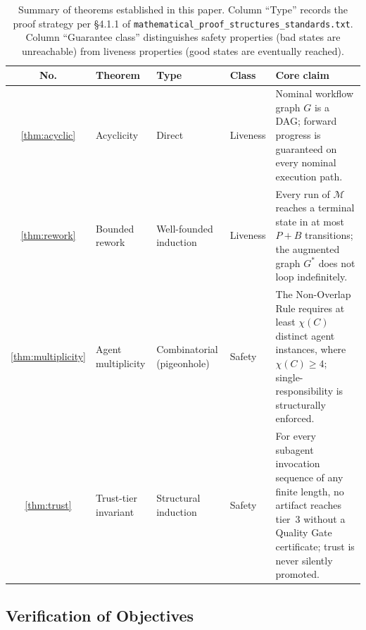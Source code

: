 \documentclass[12pt]{article}
\theoremstyle{definition}
\newcommand{\code}[1]{\texttt{#1}}
\newcommand{\ProofStd}{\code{mathematical\_proof\_\allowbreak structures\_standards.txt}}
\begin{document}
\begin{table}[H]
\centering
\caption{Summary of theorems established in this paper.
         Column ``Type'' records the proof strategy
         per \S4.1.1 of \ProofStd{}.
         Column ``Guarantee class'' distinguishes safety
         properties (bad states are unreachable) from
         liveness properties (good states are eventually reached).}
\label{tab:thm-summary}
\small
\begin{tabular}{@{}clllp{4.8cm}@{}}
\toprule
\textbf{No.} & \textbf{Theorem} & \textbf{Type} &
\textbf{Class} & \textbf{Core claim} \\
\midrule
\ref{thm:acyclic}
  & Acyclicity
  & Direct
  & Liveness
  & Nominal workflow graph $G$ is a DAG; forward
    progress is guaranteed on every nominal
    execution path. \\[4pt]
\ref{thm:rework}
  & Bounded rework
  & Well-founded induction
  & Liveness
  & Every run of $\mathcal{M}$ reaches a terminal
    state in at most $P + B$ transitions; the
    augmented graph $G^{*}$ does not loop
    indefinitely. \\[4pt]
\ref{thm:multiplicity}
  & Agent multiplicity
  & Combinatorial (pigeonhole)
  & Safety
  & The Non-Overlap Rule requires at least
    $\chi(C)$ distinct agent instances, where
    $\chi(C) \geq 4$; single-responsibility
    is structurally enforced. \\[4pt]
\ref{thm:trust}
  & Trust-tier invariant
  & Structural induction
  & Safety
  & For every subagent invocation sequence of
    any finite length, no artifact reaches
    tier~3 without a Quality Gate certificate;
    trust is never silently promoted. \\
\bottomrule
\end{tabular}
\end{table}

\subsection{Verification of Objectives}
\label{sec:conclusion:objectives}
\end{document}
